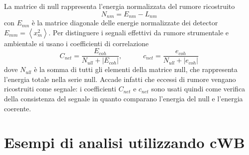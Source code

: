 La matrice di null rappresenta l'energia normalizzata del rumore ricostruito
\begin{equation}
	N_{nm} = E_{nm}-L_{nm}
\end{equation}
con $E_{mn}$  è la matrice diagonale delle energie normalizzate dei detector $E_{mm}  = \left<x_m^2\right>$. Per distinguere i segnali effettivi da rumore strumentale e ambientale si usano i coefficienti di correlazione 
\begin{equation}
	C_{net} = \frac{E_{coh}}{N_{ull}+|E_{coh}|}, \quad\quad\quad c_{net} = \frac{e_{coh}}{N_{ull}+|e_{coh}|}
\end{equation}
dove $N_{ull}$ è la somma di tutti gli elementi della matrice null, che rappresenta l'energia totale nella serie null. Accade infatti che eccessi di rumore vengano ricostruiti come segnale: i coefficienti $C_{net}$ e $c_{net}$ sono usati quindi come verifica della consistenza del segnale in quanto comparano l'energia del null e l'energia coerente\cite{Klimenko_2008}.





%
%

\section{Esempi di analisi utilizzando cWB}
\label{section:examples}

